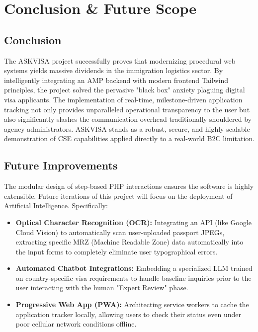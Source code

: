 \documentclass[12pt, a4paper]{article}
\begin{document}
\section{Conclusion \& Future Scope}

\subsection{Conclusion}
The ASKVISA project successfully proves that modernizing procedural web systems yields massive dividends in the immigration logistics sector. By intelligently integrating an AMP backend with modern frontend Tailwind principles, the project solved the pervasive "black box" anxiety plaguing digital visa applicants. The implementation of real-time, milestone-driven application tracking not only provides unparalleled operational transparency to the user but also significantly slashes the communication overhead traditionally shouldered by agency administrators. ASKVISA stands as a robust, secure, and highly scalable demonstration of CSE capabilities applied directly to a real-world B2C limitation.

\subsection{Future Improvements}
The modular design of step-based PHP interactions ensures the software is highly extensible. Future iterations of this project will focus on the deployment of Artificial Intelligence. Specifically:
\begin{itemize}
    \item \textbf{Optical Character Recognition (OCR):} Integrating an API (like Google Cloud Vision) to automatically scan user-uploaded passport JPEGs, extracting specific MRZ (Machine Readable Zone) data automatically into the input forms to completely eliminate user typographical errors.
    \item \textbf{Automated Chatbot Integrations:} Embedding a specialized LLM trained on country-specific visa requirements to handle baseline inquiries prior to the user interacting with the human "Expert Review" phase.
    \item \textbf{Progressive Web App (PWA):} Architecting service workers to cache the application tracker locally, allowing users to check their status even under poor cellular network conditions offline.
\end{itemize}

\newpage
\end{document}
